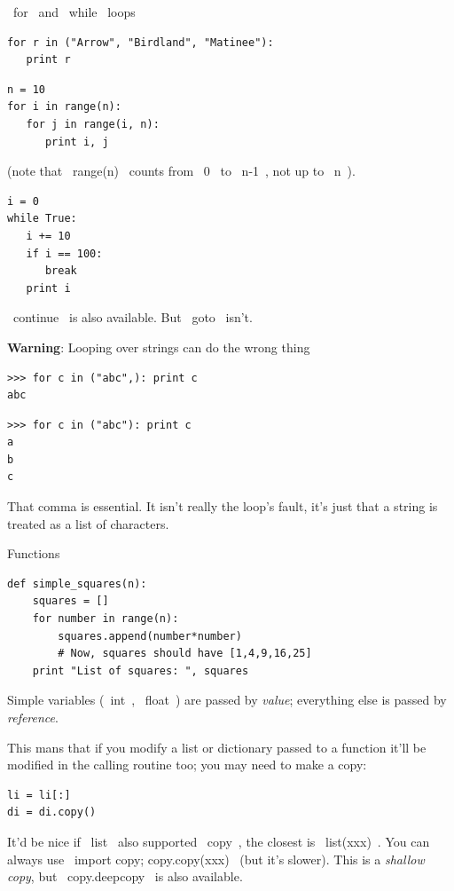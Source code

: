 \documentclass[10pt, t]{beamer}
\let\verb=\codeDelimTwiddles
\let\alert=\textbf
\begin{document}
\begin{frame}[fragile,label=sec-2-12]{\verb~for~ and \verb~while~ loops}
 \lstset{language=Python,label= ,caption= ,numbers=none}
\begin{lstlisting}
for r in ("Arrow", "Birdland", "Matinee"):
   print r
\end{lstlisting}
\pause
\lstset{language=Python,label= ,caption= ,numbers=none}
\begin{lstlisting}
n = 10
for i in range(n):
   for j in range(i, n):
      print i, j
\end{lstlisting}
(note that \verb~range(n)~ counts from \verb~0~ to \verb~n-1~, not up to \verb~n~).
\pause
\lstset{language=Python,label= ,caption= ,numbers=none}
\begin{lstlisting}
i = 0
while True:
   i += 10
   if i == 100:
      break
   print i
\end{lstlisting}
\pause \verb~continue~ is also available.
\pause But \verb~goto~ isn't.

\pause
\alert{Warning}: Looping over strings can do the wrong thing
\lstset{language=Python,label= ,caption= ,numbers=none}
\begin{lstlisting}
>>> for c in ("abc",): print c
abc
\end{lstlisting}
\pause
\lstset{language=Python,label= ,caption= ,numbers=none}
\begin{lstlisting}
>>> for c in ("abc"): print c
a
b
c
\end{lstlisting}
\pause
That comma is essential.  
It isn't really the loop's fault, it's just that a string is treated as a list of characters.
\end{frame}

\begin{frame}[fragile,label=sec-2-13]{Functions}
 \lstset{language=Python,label= ,caption= ,numbers=none}
\begin{lstlisting}
def simple_squares(n):
    squares = []
    for number in range(n):
        squares.append(number*number)
        # Now, squares should have [1,4,9,16,25]
    print "List of squares: ", squares
\end{lstlisting}
\pause
Simple variables (\verb~int~, \verb~float~) are passed by \emph{value}; everything else is passed by \emph{reference}.

\pause
This mans that if you modify a list or dictionary passed to a function it'll be modified in the calling routine too; 
you may need to make a copy:
\lstset{language=C,label= ,caption= ,numbers=none}
\begin{lstlisting}
li = li[:]
di = di.copy()
\end{lstlisting}
It'd be nice if \verb~list~ also supported \verb~copy~, the closest is \verb~list(xxx)~.
You can always use \verb~import copy; copy.copy(xxx)~ (but it's slower).
\pause
This is a \emph{shallow copy}, but \verb~copy.deepcopy~ is also available.
\end{frame}
\end{document}
